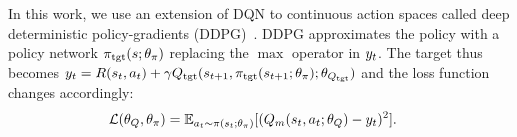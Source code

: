 In this work, we use an extension of DQN to continuous action spaces called
deep deterministic policy-gradients
(DDPG)~\citep{lillicrap2015continuous}. DDPG approximates the
policy with a policy network $\pi_{\text{tgt}}(s; \theta_\pi)$ replacing the $\max$
operator in $y_t$. The target thus becomes 
$ y_t = R(s_t, a_t) + \gamma
Q_{\text{tgt}}(s_{t+1}, \pi_{\text{tgt}}(s_{t+1}; \theta_\pi); \theta_{Q_{\text{tgt}}})$ and the
loss function changes accordingly:
%
\newcommand{\policytgt}{\policy_\text{tgt}}%
\begin{align}
  \mathcal{L}(\theta_Q, \theta_\pi) &= \mathbb{E}_{a_t \sim \pi(s_t; \theta_\pi)}[
                                      (Q_m(s_t, a_t; \theta_Q) - y_t)^2].
\end{align}
%



